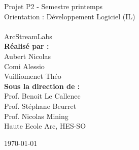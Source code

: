 \begin{titlepage}
\begin{flushright}
\huge Projet P2 - Semestre printemps\\[0.5cm]

\large Orientation : Développement Logiciel (IL)\\[0.5cm]
~\\[1cm]
{
\Huge ArcStreamLabs \\[1.5cm]
}
{
\textbf{Réalisé par :}\\
\huge Aubert Nicolas\\[0.1cm]
\huge Comi Alessio\\[0.1cm]
\huge Vuilliomenet Théo\\[1.0cm]
}
{
\textbf{Sous la direction de :} \\
Prof. Benoit Le Callenec\\
Prof. Stéphane Beurret\\
Prof. Nicolas Mining\\[0.5cm]
Haute Ecole Arc, HES-SO\\[0.5cm]
}
\vfill

{\today}

\end{flushright}
\end{titlepage}
